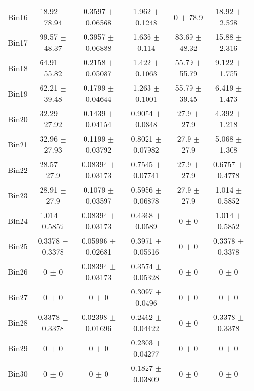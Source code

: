 \begin{tabular}{@{\extracolsep{4pt}}lccccc@{}}
     Bin16 & 18.92 $\pm$ 78.94 & 0.3597 $\pm$ 0.06568 & 1.962 $\pm$ 0.1248 & 0 $\pm$ 78.9 & 18.92 $\pm$ 2.528 \\ 
     Bin17 & 99.57 $\pm$ 48.37 & 0.3957 $\pm$ 0.06888 & 1.636 $\pm$ 0.114 & 83.69 $\pm$ 48.32 & 15.88 $\pm$ 2.316 \\ 
     Bin18 & 64.91 $\pm$ 55.82 & 0.2158 $\pm$ 0.05087 & 1.422 $\pm$ 0.1063 & 55.79 $\pm$ 55.79 & 9.122 $\pm$ 1.755 \\ 
     Bin19 & 62.21 $\pm$ 39.48 & 0.1799 $\pm$ 0.04644 & 1.263 $\pm$ 0.1001 & 55.79 $\pm$ 39.45 & 6.419 $\pm$ 1.473 \\ 
     Bin20 & 32.29 $\pm$ 27.92 & 0.1439 $\pm$ 0.04154 & 0.9054 $\pm$ 0.0848 & 27.9 $\pm$ 27.9 & 4.392 $\pm$ 1.218 \\ 
     Bin21 & 32.96 $\pm$ 27.93 & 0.1199 $\pm$ 0.03792 & 0.8021 $\pm$ 0.07982 & 27.9 $\pm$ 27.9 & 5.068 $\pm$ 1.308 \\ 
     Bin22 & 28.57 $\pm$ 27.9 & 0.08394 $\pm$ 0.03173 & 0.7545 $\pm$ 0.07741 & 27.9 $\pm$ 27.9 & 0.6757 $\pm$ 0.4778 \\ 
     Bin23 & 28.91 $\pm$ 27.9 & 0.1079 $\pm$ 0.03597 & 0.5956 $\pm$ 0.06878 & 27.9 $\pm$ 27.9 & 1.014 $\pm$ 0.5852 \\ 
     Bin24 & 1.014 $\pm$ 0.5852 & 0.08394 $\pm$ 0.03173 & 0.4368 $\pm$ 0.0589 & 0 $\pm$ 0 & 1.014 $\pm$ 0.5852 \\ 
     Bin25 & 0.3378 $\pm$ 0.3378 & 0.05996 $\pm$ 0.02681 & 0.3971 $\pm$ 0.05616 & 0 $\pm$ 0 & 0.3378 $\pm$ 0.3378 \\ 
     Bin26 & 0 $\pm$ 0 & 0.08394 $\pm$ 0.03173 & 0.3574 $\pm$ 0.05328 & 0 $\pm$ 0 & 0 $\pm$ 0 \\ 
     Bin27 & 0 $\pm$ 0 & 0 $\pm$ 0 & 0.3097 $\pm$ 0.0496 & 0 $\pm$ 0 & 0 $\pm$ 0 \\ 
     Bin28 & 0.3378 $\pm$ 0.3378 & 0.02398 $\pm$ 0.01696 & 0.2462 $\pm$ 0.04422 & 0 $\pm$ 0 & 0.3378 $\pm$ 0.3378 \\ 
     Bin29 & 0 $\pm$ 0 & 0 $\pm$ 0 & 0.2303 $\pm$ 0.04277 & 0 $\pm$ 0 & 0 $\pm$ 0 \\ 
     Bin30 & 0 $\pm$ 0 & 0 $\pm$ 0 & 0.1827 $\pm$ 0.03809 & 0 $\pm$ 0 & 0 $\pm$ 0 \\ 
\hline\hline
  \end{tabular}
